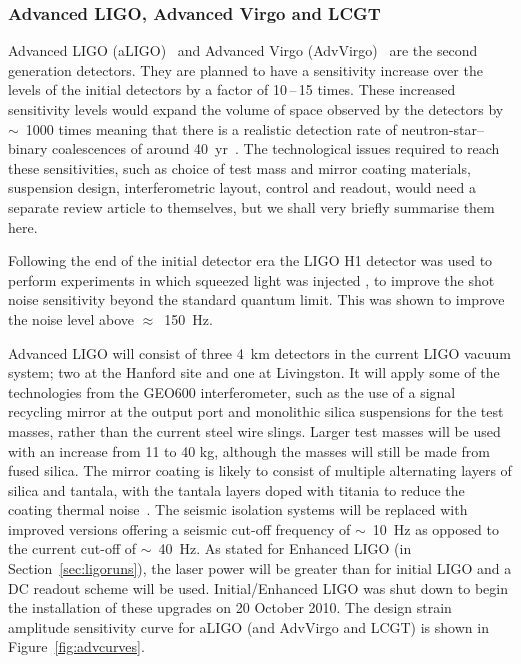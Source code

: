 \subsubsection{Advanced LIGO, Advanced Virgo and LCGT}
\label{subsection:aligo} 

Advanced LIGO (aLIGO)~\cite{Harry:2010, AdvLIGO, AdvLIGOweb} and Advanced Virgo
(AdvVirgo)~\cite{AdvVirgoDesign, AdvVirgoweb} are the second generation
detectors. They are planned to have a sensitivity increase over the levels of
the initial detectors by a factor of 10\,--\,15 times. These increased sensitivity
levels would expand the volume of space observed by the detectors by $\sim$~1000
times meaning that there is a realistic detection rate of neutron-star--binary
coalescences of around 40~yr~\cite{Abadie:2010e, Kopparapu:2008}.
The technological issues required to reach these sensitivities, such as choice
of test mass and mirror coating materials, suspension design, interferometric
layout, control and readout, would need a separate review article to themselves,
but we shall very briefly summarise them here.

Following the end of the initial detector era the LIGO H1 detector was used to perform experiments in which 
squeezed light was injected \cite{2013NaPho...7..613A}, to improve the shot noise sensitivity beyond the 
standard quantum limit. This was shown to improve the noise level above $\approx$~150~Hz.

Advanced LIGO will consist of three 4~km detectors in the current LIGO vacuum
system; two at the Hanford site and one at
Livingston. It will apply some of the technologies from the GEO600
interferometer, such as the use of a signal recycling mirror at the output port
and monolithic silica suspensions for the test masses, rather than the current
steel wire slings. Larger test masses will be used with an increase from 11 to
40 kg, although the masses will still be made from fused silica. The mirror
coating is likely to consist of multiple alternating layers of silica and
tantala, with the tantala layers doped with titania to reduce the coating
thermal noise~\cite{Agresti:2006}. The seismic isolation systems will be
replaced with improved versions offering a seismic cut-off frequency
of $\sim$~10~Hz as opposed to the current cut-off of $\sim$~40~Hz. As
stated for Enhanced LIGO (in Section~\ref{sec:ligoruns}), the laser
power will be greater than for initial LIGO and a DC readout scheme
will be used. Initial/Enhanced LIGO was shut down to begin the
installation of these upgrades on 20 October 2010. The design strain
amplitude sensitivity curve for aLIGO (and AdvVirgo and LCGT) is shown
in Figure~\ref{fig:advcurves}.

